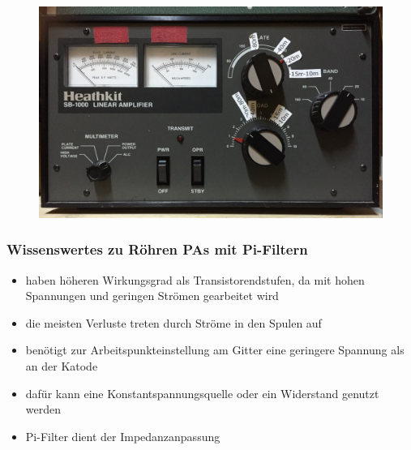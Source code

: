 \begin{frame}
  \begin{center}
    \begin{figure}
      \includegraphics[width=\textwidth,height=.9\textheight,keepaspectratio]{a07/Heathkit.jpg}
    \end{figure}
  \end{center}
\end{frame}

\begin{frame}
  \frametitle{Wissenswertes zu Röhren PAs mit Pi-Filtern}
  \begin{center}
    \begin{itemize}
      \item haben höheren Wirkungsgrad als Transistorendstufen, da mit hohen Spannungen und geringen Strömen gearbeitet wird
      \item die meisten Verluste treten durch Ströme in den Spulen auf
      \item benötigt zur Arbeitspunkteinstellung am Gitter eine geringere Spannung als an der Katode
      \item dafür kann eine Konstantspannungsquelle oder ein Widerstand genutzt werden
      \item Pi-Filter dient der Impedanzanpassung
    \end{itemize}
  \end{center}
\end{frame}

